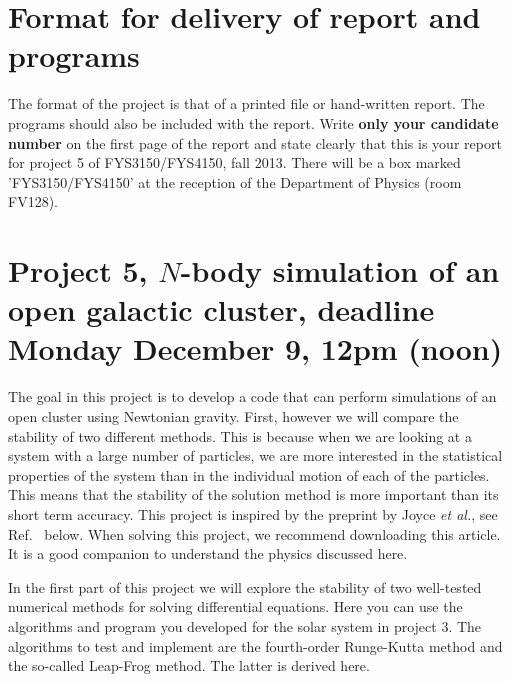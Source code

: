 \documentclass[10pt]{article}
\begin{document}
\section*{Format for delivery of report and programs}
%
The format of the project is that of a printed file or hand-written report.
The programs should also be included with the report. Write {\bf only your candidate number} on the first
page of the report and state clearly that this is your report for project 5 of FYS3150/FYS4150, fall 2013. 
There will be a box marked 'FYS3150/FYS4150' at the reception of the Department of Physics (room FV128). 

\section*{Project 5, $N$-body simulation of an open galactic cluster, deadline   Monday December 9, 12pm (noon)}


The goal in this project is to develop a code that can perform simulations of an
open cluster using Newtonian gravity. First, however we will compare
the stability of two different methods. This is because when we are
looking at a system with a large number of particles, we are more
interested in the statistical properties of the system than in the
individual motion of each of the particles. This means that the
stability of the solution method is more important than its short term
accuracy.  This project is inspired by the preprint by Joyce {\em et al.}, see Ref.~\cite{astrobabes} below.
When  solving this project, we recommend downloading this article. It is a good companion to understand the 
physics discussed here. 

In the first part of this project we will explore the stability of two
well-tested numerical methods for solving differential equations. Here
you can use the algorithms and program you developed for the solar
system in project 3.  The algorithms to test and implement are the fourth-order Runge-Kutta
method and the so-called Leap-Frog method. The latter is derived here.
\end{document}
